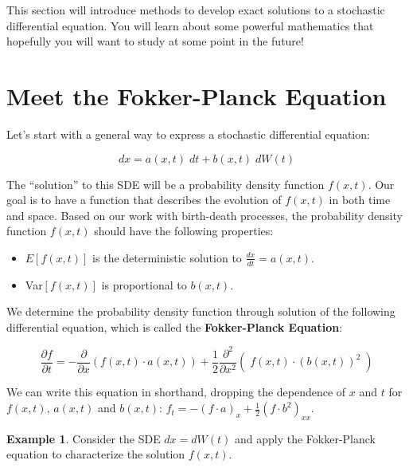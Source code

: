 \documentclass[
]{book}
\providecommand{\tightlist}{%
  \setlength{\itemsep}{0pt}\setlength{\parskip}{0pt}}
\theoremstyle{definition}
\theoremstyle{definition}
\newtheorem{example}{Example}[chapter]
\theoremstyle{definition}
\theoremstyle{remark}
\begin{document}
This section will introduce methods to develop exact solutions to a stochastic differential equation. You will learn about some powerful mathematics that hopefully you will want to study at some point in the future!

\hypertarget{meet-the-fokker-planck-equation}{%
\section{Meet the Fokker-Planck Equation}\label{meet-the-fokker-planck-equation}}

Let's start with a general way to express a stochastic differential equation:

\begin{equation}
dx = a(x,t) \; dt + b(x,t) \; dW(t)
\end{equation}

The ``solution'' to this SDE will be a probability density function \(f(x,t)\).
Our goal is to have a function that describes the evolution of \(f(x,t)\) in both time and space. Based on our work with birth-death processes, the probability density function \(f(x,t)\) should have the following properties:

\begin{itemize}
\tightlist
\item
  \(E[f(x,t)]\) is the deterministic solution to \(\displaystyle \frac{dx}{dt} = a(x,t)\).
\item
  Var\([f(x,t)]\) is proportional to \(b(x,t)\).
\end{itemize}

We determine the probability density function through solution of the following differential equation, which is called the \textbf{Fokker-Planck Equation}:

\begin{equation}
\frac{\partial f}{\partial t} = - \frac{\partial}{\partial x} \left(f(x,t) \cdot a(x,t) \right) + \frac{1}{2}\frac{\partial^{2} }{\partial x^{2}} \left(\; f(x,t) \cdot (b(x,t))^{2}  \;\right)
\end{equation}

We can write this equation in shorthand, dropping the dependence of \(x\) and \(t\) for \(f(x,t)\), \(a(x,t)\) and \(b(x,t)\): \(\displaystyle f_{t} = - (f \cdot a)_{x} + \frac{1}{2} (f \cdot b^{2})_{xx}\).

\begin{example}
\protect\hypertarget{exm:unnamed-chunk-358}{}{\label{exm:unnamed-chunk-358} }Consider the SDE \(dx = dW(t)\) and apply the Fokker-Planck equation to characterize the solution \(f(x,t)\).
\end{example}
\end{document}
